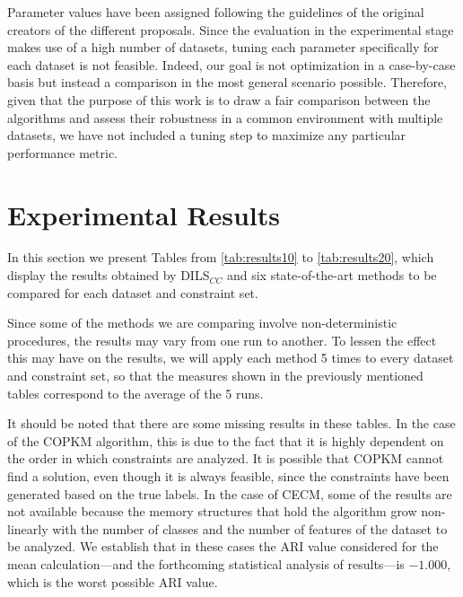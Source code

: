 \documentclass[review]{elsarticle}
\begin{document}
Parameter values have been assigned following the guidelines of the original creators of the different proposals. Since the evaluation in the experimental stage makes use of a high number of datasets, tuning each parameter specifically for each dataset is not feasible. Indeed, our goal is not optimization in a case-by-case basis but instead a comparison in the most general scenario possible. Therefore, given that the purpose of this work is to draw a fair comparison between the algorithms and assess their robustness in a common environment with multiple datasets, we have not included a tuning step to maximize any particular performance metric.

\section{Experimental Results} \label{sec:results}

In this section we present Tables from \ref{tab:results10} to \ref{tab:results20}, which display the results obtained by DILS$_{CC}$ and six state-of-the-art methods to be compared for each dataset and constraint set.

Since some of the methods we are comparing involve non-deterministic procedures, the results may vary from one run to another. To lessen the effect this may have on the results, we will apply each method 5 times to every dataset and constraint set, so that the measures shown in the previously mentioned tables correspond to the average of the 5 runs.

It should be noted that there are some missing results in these tables. In the case of the COPKM algorithm, this is due to the fact that it is highly dependent on the order in which constraints are analyzed. It is possible that COPKM cannot find a solution, even though it is always feasible, since the constraints have been generated based on the true labels. In the case of CECM, some of the results are not available because the memory structures that hold the algorithm grow non-linearly with the number of classes and the number of features of the dataset to be analyzed. We establish that in these cases the ARI value considered for the mean calculation---and the forthcoming statistical analysis of results---is $-1.000$, which is the worst possible ARI value.
	
\end{document}
